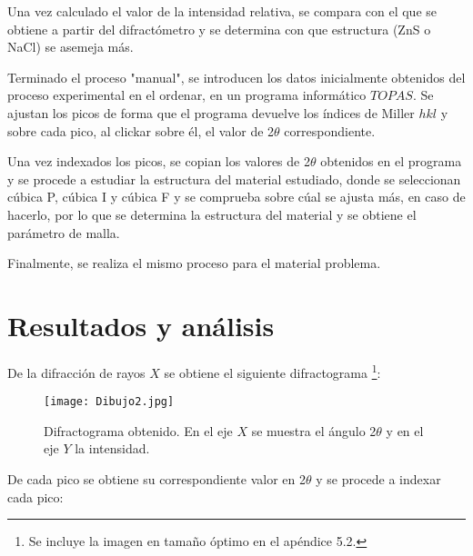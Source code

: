 \documentclass[a4paper,twocolumn,10pt]{article}
\begin{document}
Una vez calculado el valor de la intensidad relativa, se compara con el que se obtiene a partir del difractómetro y se determina con que estructura (ZnS o NaCl) se asemeja más.

Terminado el proceso "manual", se introducen los datos inicialmente obtenidos del proceso experimental en el ordenar, en un programa informático $TOPAS$. Se ajustan los picos de forma que el programa devuelve los índices de Miller $hkl$  y sobre cada pico, al clickar sobre él, el valor de 2$\theta$ correspondiente.

Una vez indexados los picos, se copian los valores de 2$\theta$ obtenidos en el programa y se procede a estudiar la estructura del material estudiado, donde se seleccionan cúbica P, cúbica I y cúbica F y se comprueba sobre cúal se ajusta más, en caso de hacerlo, por lo que se determina la estructura del material y se obtiene el parámetro de malla.

Finalmente, se realiza el mismo proceso para el material problema.








\section{Resultados y análisis}
De la difracción de rayos $X$ se obtiene el siguiente difractograma \footnote{Se incluye la imagen en tamaño óptimo en el apéndice 5.2.}:

\begin{figure}[H]
\centering
\texttt{[image: Dibujo2.jpg]}
\caption{Difractograma obtenido. En el eje $X$ se muestra el ángulo 2$\theta$ y en el eje $Y$ la intensidad.} 
\label{Figura 1:Dibujo2}
\end{figure}

De cada pico se obtiene su correspondiente valor en 2$\theta$ y se procede a indexar cada pico:
\end{document}
